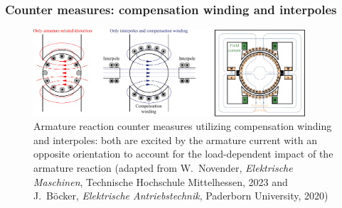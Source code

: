 \begin{frame}
	\frametitle{Counter measures: compensation winding and interpoles}
    \begin{figure}
        \centering
        \includegraphics[width=0.9\textwidth]{fig/lec03/Compensation_winding_interpoles.pdf}
        \caption{Armature reaction counter measures utilizing compensation winding and interpoles: both are excited by the armature current with an opposite orientation to account for the load-dependent impact of the armature reaction (adapted from W.~Novender, \textit{Elektrische Maschinen}, Technische Hochschule Mittelhessen, 2023 and J.~B\"ocker, \textit{Elektrische Antriebstechnik}, Paderborn University, 2020)} 
		\label{fig:Compensation_winding_interpoles}
    \end{figure}
\end{frame}

